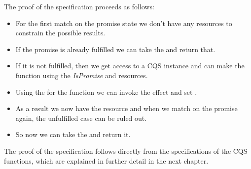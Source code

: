 The proof of the  specification proceeds as follows:
\begin{itemize}
  \item For the first match on the promise state we don't have any resources to constrain the possible results.
  \item If the promise is already fulfilled we can take the  and return that.
  \item If it is not fulfilled, then we get access to a CQS instance and can make the  function using the \textit{IsPromise} and  resources.
  \item Using the \ewpt{} for the  function we can invoke the \esuspend{} effect and set .
  \item As a result we now have the \gspdone{} resource and when we match on the promise again, the unfulfilled case can be ruled out.
  \item So now we can take the  and return it.
\end{itemize}

The proof of the  specification follows directly from the specifications of the CQS functions, which are explained in further detail in the next chapter.



